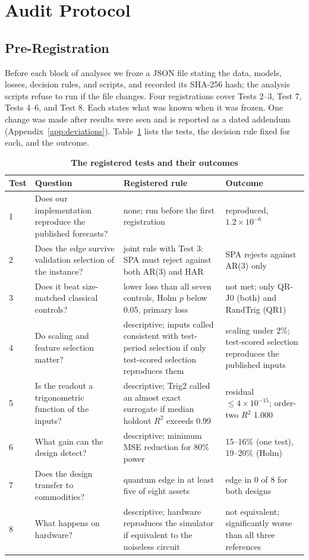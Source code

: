 \documentclass{ieeeaccess}
\begin{document}
\section{Audit Protocol}
\label{sec:protocol}

\subsection{Pre-Registration}
Before each block of analyses we froze a JSON file stating the data, models, losses, decision rules, and scripts, and recorded its SHA-256 hash; the analysis scripts refuse to run if the file changes. Four registrations cover Tests 2--3, Test 7, Tests 4--6, and Test 8. Each states what was known when it was frozen. One change was made after results were seen and is reported as a dated addendum (Appendix~\ref{app:deviations}). Table~\ref{tab:tests} lists the tests, the decision rule fixed for each, and the outcome.

\begin{table}[t]
\caption{\textbf{The registered tests and their outcomes}}
\label{tab:tests}
\setlength{\tabcolsep}{3pt}
\begin{tabular}{|l|p{120pt}|p{170pt}|p{150pt}|}
\hline
Test & Question & Registered rule & Outcome\\
\hline
1 & Does our implementation reproduce the published forecasts? & none; run before the first registration & reproduced, $1.2\times10^{-6}$\\
2 & Does the edge survive validation selection of the instance? & joint rule with Test 3: SPA must reject against both AR(3) and HAR & SPA rejects against AR(3) only\\
3 & Does it beat size-matched classical controls? & lower loss than all seven controls, Holm $p$ below 0.05, primary loss & not met; only QR-J0 (both) and RandTrig (QR1)\\
4 & Do scaling and feature selection matter? & descriptive; inputs called consistent with test-period selection if only test-scored selection reproduces them & scaling under 2\%; test-scored selection reproduces the published inputs\\
5 & Is the readout a trigonometric function of the inputs? & descriptive; Trig2 called an almost exact surrogate if median holdout $R^2$ exceeds 0.99 & residual $\le4\times10^{-15}$; order-two $R^2$ 1.000\\
6 & What gain can the design detect? & descriptive; minimum MSE reduction for 80\% power & 15--16\% (one test), 19--20\% (Holm)\\
7 & Does the design transfer to commodities? & quantum edge in at least five of eight assets & edge in 0 of 8 for both designs\\
8 & What happens on hardware? & descriptive; hardware reproduces the simulator if equivalent to the noiseless circuit & not equivalent; significantly worse than all three references\\
\hline
\end{tabular}
\end{table}
\end{document}
